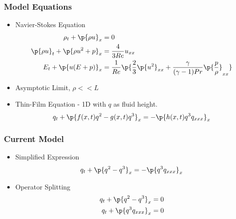 \documentclass[10pt]{beamer}
\begin{document}
    \begin{frame}
      \frametitle{Model Equations}
      \begin{itemize}
        \item Navier-Stokes Equation
          \begin{align*}
            \rho_t + \p{\rho u}_x &= 0 \\
            \p{\rho u}_t + \p{\rho u^2 + p}_x &=  \frac{4}{3Re} u_{xx} \\
            E_t + \p{u (E + p)}_x &= \frac{1}{Re} \p{\frac{2}{3} \p{u^2}_{xx} + \frac{\gamma}{(\gamma - 1)Pr} \p{\frac{p}{\rho}}_{xx}}
          \end{align*}
        \item Asymptotic Limit, $\rho << L$
        \item Thin-Film Equation - 1D with $q$ as fluid height.
          \[
            q_t + \p{f(x, t) q^2 - g(x, t) q^3}_x = -\p{h(x, t) q^3 q_{xxx}}_x
          \]
      \end{itemize}
    \end{frame}

    \begin{frame}
      \frametitle{Current Model}
      \begin{itemize}
        \item Simplified Expression
          \[
            q_t + \p{q^2 - q^3}_x = -\p{q^3 q_{xxx}}_x
          \]

        \item Operator Splitting
          \begin{align*}
            q_t + \p{q^2 - q^3}_x &= 0 \\
            q_t + \p{q^3 q_{xxx}}_x &= 0
          \end{align*}
      \end{itemize}
    \end{frame}
\end{document}
